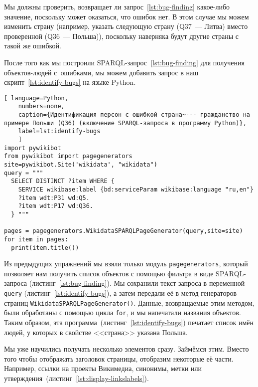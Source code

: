 Мы должны проверить, возвращает ли запрос~\ref{lst:bug-finding} какое-либо значение, 
поскольку может оказаться, что ошибок нет. 
В этом случае мы можем изменить страну 
(например, указать следующую страну (Q37~--- Литва) вместо проверенной (Q36~--- Польша)), 
поскольку наверняка будут другие страны с такой же ошибкой.

После того как мы построили SPARQL-запрос~\ref{lst:bug-finding} для получения объектов-людей с~ошибками, 
мы можем добавить запрос в наш скрипт~\ref{lst:identify-bugs} на языке Python.

\begin{lstlisting}[ language=Python,
    numbers=none,
    caption={Идентификация персон с ошибкой страна~--- гражданство на примере Польши (Q36) (включение SPARQL-запроса в программу Python)},
    label=lst:identify-bugs
    ]
import pywikibot
from pywikibot import pagegenerators
site=pywikibot.Site('wikidata', "wikidata")
query = """
  SELECT DISTINCT ?item WHERE {
    SERVICE wikibase:label {bd:serviceParam wikibase:language "ru,en"}
    ?item wdt:P31 wd:Q5.
    ?item wdt:P17 wd:Q36.
  } """

pages = pagegenerators.WikidataSPARQLPageGenerator(query,site=site)
for item in pages:
  print(item.title())
\end{lstlisting}    

Из предыдущих упражнений мы взяли только модуль \lstinline|pagegenerators|, 
который позволяет нам получить список объектов с помощью фильтра в виде SPARQL-запроса 
(листинг~\ref{lst:bug-finding}). 
Мы сохранили текст запроса в переменной \lstinline|query| (листинг~\ref{lst:identify-bugs}), 
а затем передали её в метод генераторов страниц \lstinline|WikidataSPARQLPageGenerator()|. 
Данные, возвращаемые этим методом, были обработаны с помощью цикла \lstinline|for|, 
и мы напечатали названия объектов.
Таким образом, эта программа~(листинг~\ref{lst:identify-bugs}) печатает список имён людей, у которых в свойстве <<страна>> указана Польша.

Мы уже научились получать несколько элементов сразу. Займёмся этим. 
Вместо того чтобы отображать заголовок страницы, отобразим некоторые её части. 
Например, ссылки на проекты Викимедиа, синонимы, метки или утверждения~(листинг~\ref{lst:display-linkslabels}).



